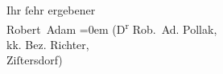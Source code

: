 \pstart
           Ihr{ }ſehr ergebener{\\[\baselineskip]}\spacefill\mbox{Robert Adam}\pend
           \leftskip=0em{}
\pstart
           \noindent{}\raggedleft{}(D\textsuperscript{r} Rob. Ad. Pollak,{\\}kk. Bez. Richter,{\\}Ziſtersdorf)\pend
           \endnumbering{}  \newcommand{\dateiname}{L02207}\newcommand{\titel}{Robert Adam an Arthur Schnitzler, 1. 6. 1915}\newcommand{\editorInnen}{Martin Anton Müller und Gerd-Hermann Susen}
